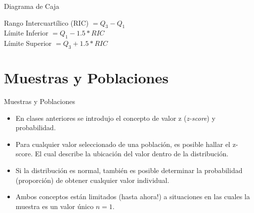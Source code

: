 \documentclass{beamer}
\begin{document}
\begin{frame}{Diagrama de Caja}
	\begin{center}


		\end{center}
		\begin{center}
		Rango Intercuartílico (RIC) $= Q_3-Q_1$ \\
		Límite Inferior $=Q_1-1.5*RIC$ \\
			Límite Superior $=Q_3+1.5*RIC$
		\end{center}

\end{frame}
\section{Muestras y Poblaciones}
\begin{frame} [fragile]{Muestras y Poblaciones}
\begin{itemize}
\justifying
\item En clases anteriores se introdujo el concepto de valor z (\emph{z-score}) y probabilidad.
\item Para cualquier valor seleccionado de una población, es posible hallar el z-score. El cual describe la ubicación del valor dentro de la distribución.
\item Si la distribución es normal, también es posible determinar la probabilidad (proporción) de obtener cualquier valor individual. 
\item Ambos conceptos están limitados (hasta ahora!) a situaciones en las cuales la muestra es un valor único $n=1$.
\end{itemize}
\end{frame}
\end{document}
